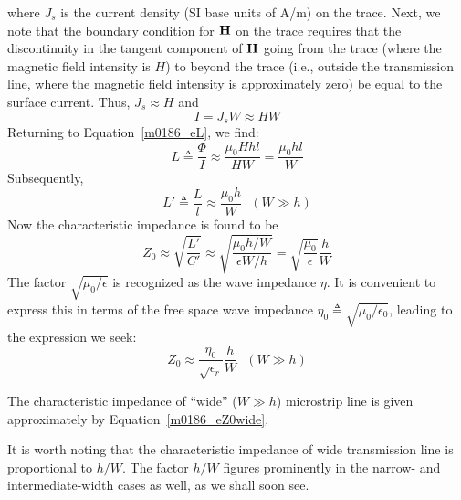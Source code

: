 %
where $J_s$ is the current density (SI base units of A/m) on the trace.
Next, we note that the boundary condition for ${\bf H}$ on the trace requires that the discontinuity in the tangent component of ${\bf H}$ going from the trace (where the magnetic field intensity is $H$) to beyond the trace (i.e., outside the transmission line, where the magnetic field intensity is approximately zero) be equal to the surface current.  Thus, $J_s \approx H$ and 
%
\begin{equation}
I = J_s W \approx H W
\end{equation}
%
Returning to Equation~\ref{m0186_eL}, we find:
%
\begin{equation}
L \triangleq \frac{\Phi}{I} \approx \frac{\mu_0 H hl}{HW} = \frac{\mu_0 hl}{W}
\end{equation}
%
Subsequently,
%
\begin{equation}
L' \triangleq \frac{L}{l} \approx \frac{\mu_0 h}{W} ~~~ (W \gg h)
\end{equation}
%
Now the characteristic impedance is found to be
%
\begin{equation}
Z_0 \approx \sqrt{\frac{L'}{C'}} \approx \sqrt{\frac{\mu_0 h/W}{\epsilon W/h}} = \sqrt{\frac{\mu_0}{\epsilon}}\frac{h}{W} 
\end{equation}
%
The factor $\sqrt{\mu_0/\epsilon}$ is recognized as the wave impedance $\eta$.
It is convenient to express this in terms of the free space wave impedance $\eta_0\triangleq\sqrt{\mu_0/\epsilon_0}$,
leading to the expression we seek:
%
\begin{equation}
\boxed{
Z_0 \approx \frac{\eta_0}{\sqrt{\epsilon_r}}\frac{h}{W} ~~~ (W \gg h) 
}
\label{m0186_eZ0wide}
\end{equation}
%
\begin{mdframed}[backgroundcolor=yellow!20,nobreak=true] 
The characteristic impedance of ``wide'' ($W \gg h$) microstrip line is given approximately by Equation~\ref{m0186_eZ0wide}. 
\end{mdframed}
%
It is worth noting that the characteristic impedance of wide transmission line is proportional to $h/W$.  The factor $h/W$ figures prominently in the narrow- and intermediate-width cases as well, as we shall soon see.

